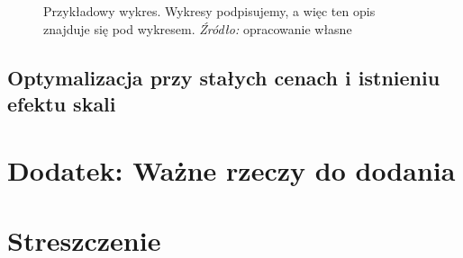 \documentclass[polish, twoside, 12pt, a4paper]{article}
\theoremstyle{definition}
\theoremstyle{plain}
\theoremstyle{remark}
\begin{document}
\begin{figure}[hbt]
  \captionsetup{margin=10pt,font=small,labelfont=bf,width=.8\textwidth}

  \caption[Krótka nazwa II]{Przykładowy wykres. Wykresy podpisujemy, a więc ten opis znajduje się pod wykresem. \textit{Źródło:} opracowanie własne}\label{fig:xxx}
\end{figure}


\subsection{Optymalizacja przy stałych cenach i istnieniu efektu skali}


\appendix

\clearpage
\section{Dodatek: Ważne rzeczy do dodania}



\clearpage



\clearpage
{}
\listoftables

\clearpage
{}
\listoffigures



\clearpage
{}
\section*{Streszczenie}
\end{document}
